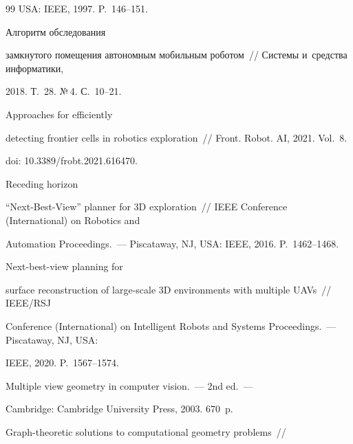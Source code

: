 {{\begin{thebibliography}{99}
USA: IEEE, 1997. P.~146--151.






   Алгоритм обследования 

замкнутого помещения автономным мобильным роботом~/\!\!/ Системы и~средства информатики, 

2018. Т.~28. №\,4. С.~10--21.




   Approaches for efficiently 

detecting frontier cells in robotics exploration~/\!\!/ Front. Robot. AI, 2021. Vol.~8. 

doi: 10.3389\!/\!frobt.2021.616470.






   Receding horizon 

  ``Next-Best-View'' planner for 3D exploration~/\!\!/  IEEE Conference (International) on Robotics and 

Automation Proceedings.~--- Piscataway, NJ, USA: IEEE, 2016. P.~1462--1468.




   Next-best-view planning for 

surface reconstruction of large-scale 3D environments with multiple UAVs~/\!\!/ IEEE/RSJ 

Conference (International) on Intelligent Robots and Systems Proceedings.~--- Piscataway, NJ, USA: 

IEEE, 2020. P.~1567--1574.




   Multiple view geometry in computer vision.~--- 2nd ed.~--- 

Cambridge: Cambridge University Press, 2003. 670~p.


   Graph-theoretic solutions to computational geometry problems~/\!\!/ 


\end{thebibliography}}}
